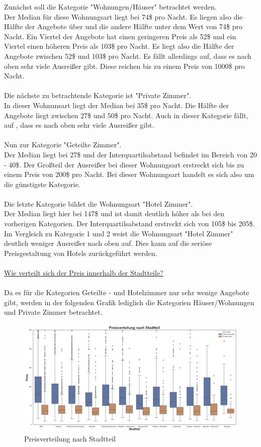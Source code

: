 \documentclass[12pt]{article}
\begin{document}
\begin{text}
\newpage
Zunächst soll die Kategorie "Wohnungen/Häuser" betrachtet werden. 
\\
Der Median für diese Wohnungsart liegt bei 74\$ pro Nacht. Es liegen also die Hälfte der Angebote über und die andere Hälfte unter dem Wert von 74\$ pro Nacht. Ein Viertel der Angebote hat einen geringeren Preis als 52\$ und ein Viertel einen höheren Preis als 103\$ pro Nacht. Es liegt also die Hälfte der Angebote zwischen 52\$ und 103\$ pro Nacht. Es fällt allerdings auf, dass es nach oben sehr viele Ausreißer gibt. Diese reichen bis zu einem Preis von 1000\$ pro Nacht.
\\\\
Die nächste zu betrachtende Kategorie ist "Private Zimmer". 
\\
In dieser Wohnunsart liegt der Median bei 35\$ pro Nacht. Die Hälfte der Angebote liegt zwischen 27\$ und 50\$ pro Nacht. Auch in dieser Kategorie fällt, auf , dass es nach oben sehr viele Ausreißer gibt.
\\\\
Nun zur Kategorie "Geteilte Zimmer".
\\
Der Median liegt bei 27\$ und der Interquartilsabstand befindet im Bereich von 20 - 40\$. Der Großteil der Ausreißer bei dieser Wohnungsart erstreckt sich bis zu einem Preis von 200\$ pro Nacht. Bei dieser Wohnungsart handelt es sich also um die günstigste Kategorie.
\\\\
Die letzte Kategorie bildet die Wohnungsart "Hotel Zimmer".
\\
Der Median liegt hier bei 147\$ und ist damit deutlich höher als bei den vorherigen Kategorien. Der Interquartilsabstand erstreckt sich von 105\$ bis 205\$. Im Vergleich zu Kategorie 1 und 2 weist die Wohnungsart "Hotel Zimmer" deutlich weniger Ausreißer nach oben auf. Dies kann auf die seriöse Preisgestaltung von Hotels zurückgeführt werden.
\\\\

\newpage
\underline{Wie verteilt sich der Preis innerhalb der Stadtteile?}
\\\\
Da es für die Kategorien Geteilte - und Hotelzimmer nur sehr wenige Angebote gibt, werden in der folgenden Grafik lediglich die Kategorien Häuser/Wohnungen und Private Zimmer betrachtet.

\begin{figure}[h]
 \includegraphics[width=1.1\textwidth]{StadtteileBild.PNG}
 \caption{Preisverteilung nach Stadtteil}
\end{figure}


\end{text}
\end{document}
